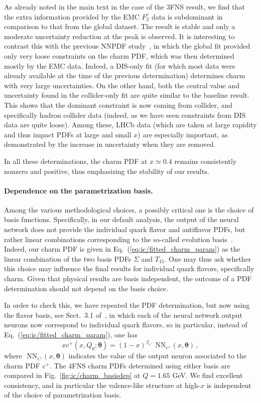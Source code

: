 As already noted in the main  text in the case of the 3FNS
result, we find that the extra information provided by the  EMC
$F_2^c$ data is subdominant in comparison to that from the global
dataset. The result is stable and only a moderate
uncertainty reduction at the peak is observed. It is interesting to
contrast this with the previous NNPDF study~\cite{Ball:2016neh}, in
which the global fit provided only very loose constraints on the charm
PDF, which was then determined mostly by the EMC data.
%
Indeed, a DIS-only fit (for which most data were already available at the time
of the previous determination) determines charm with very large
uncertainties. On the other hand, both the central value and
uncertainty found in the collider-only fit are quite similar to the
baseline result.
%
This shows that the dominant constraint is now coming from
collider, and specifically hadron collider data (indeed, as we have
seen constraints from DIS data are quite loose). Among these, LHCb
data (which are taken at large rapidity and thus impact PDFs at large
and small $x$) are especially important, as demonstrated by the
increase in uncertainty when they are removed.

In all these determinations, the charm
PDF at $x\simeq 0.4$ remains consistently nonzero and positive, thus
emphasizing the stability of our results.

\paragraph{Dependence on the parametrization basis.}
%
Among the various methodological choices, a possibly critical one is
the choice of basis functions. Specifically, in our default analysis,
the output of the neural network does not provide the individual
quark flavor and antiflavor PDFs, but rather linear combinations
corresponding to the so-called evolution
basis~\cite{Ball:2021leu}. Indeed, our charm PDF is given in
Eq.~(\ref{eq:ic/fitted_charm_param})  as the linear combination of the
two basis PDFs $\Sigma$ and $T_{15}$.
One may thus ask whether this choice may influence the final results
for individual quark flavors, specifically charm.
Given that physical results are basis
independent, the outcome of a PDF determination should not depend
on the basis choice.

In order to check this, we have repeated the PDF determination, but
now using the flavor basis, see Sect.~3.1 of~\cite{Ball:2021leu}, in which
each of the  neural network output neurons now correspond to individual quark
flavors, so in particular,
instead of Eq.~(\ref{eq:ic/fitted_charm_param}),  one has
\begin{equation}
\label{eq:ic/fitted_charm_param_flavour}
xc^+(x,Q_0;{\boldsymbol \theta}) =
 (1-x)^{\beta_{c^+}} \textrm{ NN}_{c^+}(x,{\boldsymbol \theta}) \, ,
\end{equation}
where $\textrm{ NN}_{c^+}(x,{\boldsymbol \theta})$
indicates the value of the output neuron associated to the charm PDF $c^+$.
%
The 4FNS charm PDFs determined using either basis are compared 
in Fig.~\ref{fig:ic/charm_basisdep}  at $Q=1.65$ GeV.
%
We find excellent consistency, and in particular 
the valence-like structure at high-$x$ is independent of the choice
of parametrization basis.

